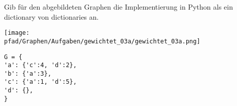 ﻿\question[4]
Gib für den abgebildeten Graphen die Implementierung in Python als
ein dictionary von dictionaries an.

\texttt{[image: \\pfad/Graphen/Aufgaben/gewichtet\_03a/gewichtet\_03a.png]}
\begin{solutionbox}{5cm}
\begin{lstlisting}
G = {
'a': {'c':4, 'd':2},
'b': {'a':3},
'c': {'a':1, 'd':5},
'd': {},
}
\end{lstlisting}
\end{solutionbox}
